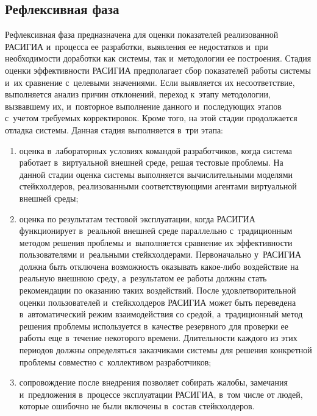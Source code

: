 \begin{multicols}{2}
\section{Рефлексивная фаза}

  Рефлексивная фаза предназначена для оценки показателей реализованной 
\mbox{РАСИГИА} и~процесса ее разработки, выявления ее недостатков и~при 
не\-об\-хо\-ди\-мости до\-ра\-бот\-ки как сис\-те\-мы, так и~методологии ее построения. 
Стадия оценки эф\-фек\-тив\-ности \mbox{РАСИГИА} предполагает сбор 
показателей работы сис\-те\-мы и~их сравнение с~целевыми значениями. Если 
выявляется их несоответствие, выполняется анализ причин отклонений, 
переход к~этапу методологии, вызвавшему их, и~повторное выполнение данного и~по\-сле\-ду\-ющих этапов с~учетом тре\-бу\-емых корректировок. Кроме того, на этой 
стадии продолжается отладка сис\-те\-мы. Данная стадия выполняется в~три этапа:
  \begin{enumerate}[(1)]
  \item оценка в~лабораторных условиях командой разработчиков, когда 
система работает в~виртуальной внешней среде, решая тестовые проб\-ле\-мы. На 
данной стадии оценка сис\-те\-мы выполняется вычислительными моделями 
стейкхолдеров, реализованными со\-от\-вет\-ст\-ву\-ющи\-ми агентами виртуальной 
внеш\-ней среды; 
  \item оценка по результатам тестовой эксплуатации, когда \mbox{РАСИГИА} 
функционирует в~реальной внеш\-ней среде параллельно с~традиционным 
методом решения проб\-ле\-мы и~выполняется сравнение их эф\-фек\-тив\-ности 
пользователями и~реальными стейк\-хол\-де\-ра\-ми. Первоначально 
у~\mbox{РАСИГИА} должна быть отключена воз\-мож\-ность оказывать ка\-кое-ли\-бо воздействие на реальную внеш\-нюю среду, а~результатом ее\linebreak
 работы 
долж\-ны стать рекомендации по оказанию таких воздействий. После 
удовлетворительной оценки пользователей и~стейк\-хол\-де\-ров \mbox{РАСИГИА} 
может быть переведена в~\mbox{автоматический} режим взаимодействия со средой, 
а~традиционный метод решения проб\-ле\-мы используется в~качестве резервного 
для проверки ее работы еще в~течение некоторого времени. Длительности 
каждого из этих периодов долж\-ны определяться заказчиками сис\-те\-мы для 
решения конкретной проб\-ле\-мы совместно с~коллективом разработчиков; 
  \item сопровождение после внед\-ре\-ния поз\-во\-ля\-ет собирать жалобы, замечания и~предложения в~процессе эксплуатации \mbox{РАСИГИА}, в~том чис\-ле от 
людей, которые ошибочно не были включены в~со\-став стейкхолдеров.\\[-13pt] 
  \end{enumerate}
  

\end{multicols}
